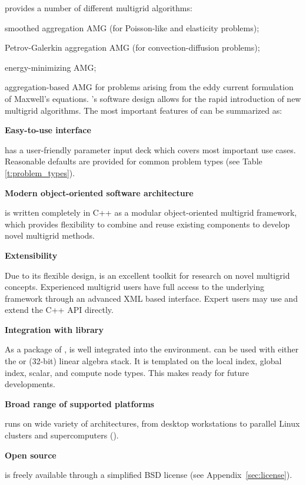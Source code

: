\muelu{} provides a number of different multigrid algorithms:
\be
  \item smoothed aggregation AMG (for Poisson-like and elasticity problems);
  \item Petrov-Galerkin aggregation AMG (for convection-diffusion problems);
  \item energy-minimizing AMG;
  \item aggregation-based AMG for problems arising from the eddy current
    formulation of Maxwell's equations.
\ee
\muelu's software design allows for the rapid introduction of new multigrid algorithms.
The most important features of \muelu{} can be summarized as:
\begin{description}
  \item \textbf{Easy-to-use interface}

    \muelu{} has a user-friendly parameter input deck which covers
    most important use cases.  Reasonable defaults are provided for common problem types
    (see Table \ref{t:problem_types}).

  \item \textbf{Modern object-oriented software architecture}

    \muelu{} is written completely in C++ as a modular object-oriented multigrid
    framework, which provides flexibility to combine and reuse existing
    components to develop novel multigrid methods.

  \item \textbf{Extensibility}

    Due to its flexible design, \muelu{} is an excellent toolkit for
    research on novel multigrid concepts. Experienced multigrid users have full
    access to the underlying framework through an advanced XML based interface.
    Expert users may use and extend the C++ API directly.

  \item \textbf{Integration with \trilinos{} library}

    As a package of \trilinos, \muelu{} is well integrated into the \trilinos
    environment. \muelu{} can be used with either the \tpetra{} or \epetra{}
    (32-bit) linear algebra stack. It is templated on the local index, global
    index, scalar, and compute node types. This makes \muelu{} ready for
    future developments.

  \item \textbf{Broad range of supported platforms}

    \muelu{} runs on wide variety of architectures, from desktop workstations to
    parallel Linux clusters and supercomputers (\cite{lin2014}).

  \item \textbf{Open source}

    \muelu{} is freely available through a simplified BSD license (see Appendix~\ref{sec:license}).
\end{description}

